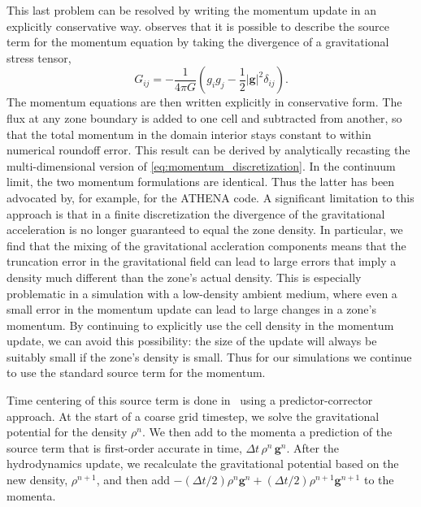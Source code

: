 \documentclass[12pt]{article}
\begin{document}
This last problem can be resolved by writing the momentum update in an explicitly
conservative way. \citet[Chapter 4]{shu:1992} observes that it is possible to describe the source term 
for the momentum equation by taking the divergence of a gravitational stress tensor,
\begin{equation}
  G_{ij} = -\frac{1}{4\pi G}\left(g_i g_j - \frac{1}{2}|\mathbf{g}|^2\delta_{ij}\right).
\end{equation}
The momentum equations are then written explicitly in conservative form.
The flux at any zone boundary is added to one cell and
subtracted from another, so that the total momentum in the domain interior stays constant to
within numerical roundoff error. This result can be derived by analytically recasting the
multi-dimensional version of \autoref{eq:momentum_discretization}. In the continuum limit, the two momentum
formulations are identical. Thus the latter has been advocated by, for example, 
\cite{jiang:2013} for the ATHENA code. A significant limitation to this approach is that in a finite discretization 
the divergence of the gravitational acceleration is no longer guaranteed to equal
the zone density. In particular, we find that the mixing of the gravitational accleration components
means that the truncation error in the gravitational field can lead to large errors
that imply a density much different than the zone's actual density. This is especially
problematic in a simulation with a low-density ambient medium, where even a small error 
in the momentum update can lead to large changes in a zone's momentum. By continuing to explicitly
use the cell density in the momentum update, we can avoid this possibility: the size of the update
will always be suitably small if the zone's density is small. Thus for our simulations
we continue to use the standard source term for the momentum.

Time centering of this source term is done in \castro\ using a predictor-corrector approach.
At the start of a coarse grid timestep, we solve the gravitational potential for the density $\rho^n$.
We then add to the momenta a prediction of the source term that is first-order accurate in time, 
$\Delta t\, \rho^n\, \mathbf{g}^n$. After the hydrodynamics update, we recalculate
the gravitational potential based on the new density, $\rho^{n+1}$, and then add 
$-(\Delta t/2) \rho^n \mathbf{g}^n + (\Delta t/2) \rho^{n+1} \mathbf{g}^{n+1}$ to the momenta.
\end{document}
